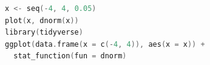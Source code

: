 \begin{lstlisting}[language=c++,label={code:17_04},caption={確率分布の可視化1}]
x <- seq(-4, 4, 0.05)
plot(x, dnorm(x))
library(tidyverse)
ggplot(data.frame(x = c(-4, 4)), aes(x = x)) +
  stat_function(fun = dnorm)
\end{lstlisting}
